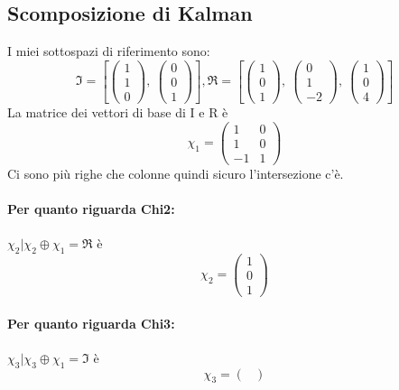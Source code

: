 \documentclass{article}
\begin{document}
\subsection{Scomposizione di Kalman}
I miei sottospazi di riferimento sono:	\[ \mathfrak{I} = \left[ \left(\begin{matrix}1\\1\\0\end{matrix}\right), \  \left(\begin{matrix}0\\0\\1\end{matrix}\right)\right], \mathfrak{R} = \left[ \left(\begin{matrix}1\\0\\1\end{matrix}\right), \  \left(\begin{matrix}0\\1\\-2\end{matrix}\right), \  \left(\begin{matrix}1\\0\\4\end{matrix}\right)\right] \]
La matrice dei vettori di base di I e R è \[ \chi_1 =  \left(\begin{matrix}1 & 0\\1 & 0\\-1 & 1\end{matrix}\right) \]
Ci sono più righe che colonne quindi sicuro l'intersezione c'è.

\paragraph{Per quanto riguarda Chi2:} $ \chi_2 | \chi_2 \oplus \chi_1 = \mathfrak{R} $ è \[ \chi_2 = \left(\begin{matrix}1\\0\\1\end{matrix}\right) \]

\paragraph{Per quanto riguarda Chi3:} $ \chi_3 | \chi_3 \oplus \chi_1 = \mathfrak{I} $ è \[ \chi_3 = \left(\begin{matrix}\end{matrix}\right) \]
\end{document}

